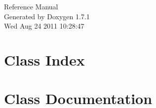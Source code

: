 \documentclass[a4paper]{book}
\begin{document}
\hypersetup{pageanchor=false}
\begin{titlepage}
\vspace*{7cm}
\begin{center}
{\Large Reference Manual}\\
\vspace*{1cm}
{\large Generated by Doxygen 1.7.1}\\
\vspace*{0.5cm}
{\small Wed Aug 24 2011 10:28:47}\\
\end{center}
\end{titlepage}
\clearemptydoublepage
{}
\tableofcontents
\clearemptydoublepage
{}
\hypersetup{pageanchor=true}
\chapter{Class Index}

\chapter{Class Documentation}



















\printindex
\end{document}
